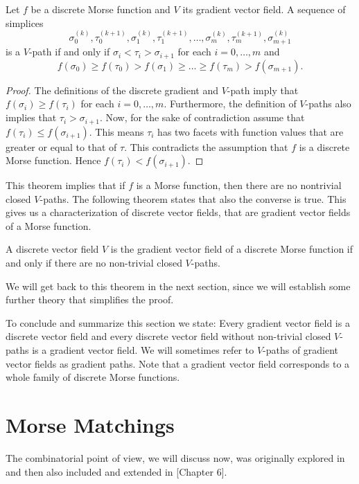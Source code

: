 \begin{thm}
\label{thm:vpath_decrease}
Let $f$ be a discrete Morse function and $V$ its gradient vector field. A sequence of simplices \[
\sigma_0^{(k)}, \tau_0^{(k+1)}, \sigma_1^{(k)}, \tau_1^{(k+1)}, \dots , \sigma_m^{(k)}, \tau_m^{(k+1)}, \sigma_{m+1}^{(k)}
\] is a $V$-path if and only if $\sigma_i < \tau_i > \sigma_{i+1}$ for each $i = 0,\dots,m$ and 
\[
f(\sigma_0) \geq f(\tau_0) > f(\sigma_1) \geq \dots \geq f(\tau_m) > f(\sigma_{m+1}).
\]
\end{thm}
\begin{proof}
The definitions of the discrete gradient and $V$-path imply that $f(\sigma_i) \geq f(\tau_i)$ for each $i = 0,\dots,m$. Furthermore, the definition of $V$-paths also implies that $\tau_i > \sigma_{i+1}$. Now, for the sake of contradiction assume that $f(\tau_i) \leq f(\sigma_{i+1})$. This means $\tau_i$ has two facets with function values that are greater or equal to that of $\tau$. This contradicts the assumption that $f$ is a discrete Morse function. Hence $f(\tau_i) < f(\sigma_{i+1})$.
\end{proof}
This theorem implies that if $f$ is a Morse function, then there are no nontrivial closed $V$-paths. The following theorem states that also the converse is true. This gives us a characterization of discrete vector fields, that are gradient vector fields of a Morse function.

\begin{thm}
\label{thm:closed_v_paths}
A discrete vector field $V$ is the gradient vector field of a discrete Morse function if and only if there are no non-trivial closed $V$-paths.
\end{thm}

We will get back to this theorem in the next section, since we will establish some further theory that simplifies the proof. 

To conclude and summarize this section we state: Every gradient vector field is a discrete vector field and every discrete vector field without non-trivial closed $V$-paths is a gradient vector field. We will sometimes refer to $V$-paths of gradient vector fields as gradient paths. Note that a gradient vector field corresponds to a whole family of discrete Morse functions.

\section{Morse Matchings}
The combinatorial point of view, we will discuss now, was originally explored in \cite{CHARI2000101} and then also included and extended in \cite{Morse+Users+Guide}[Chapter 6]. 

